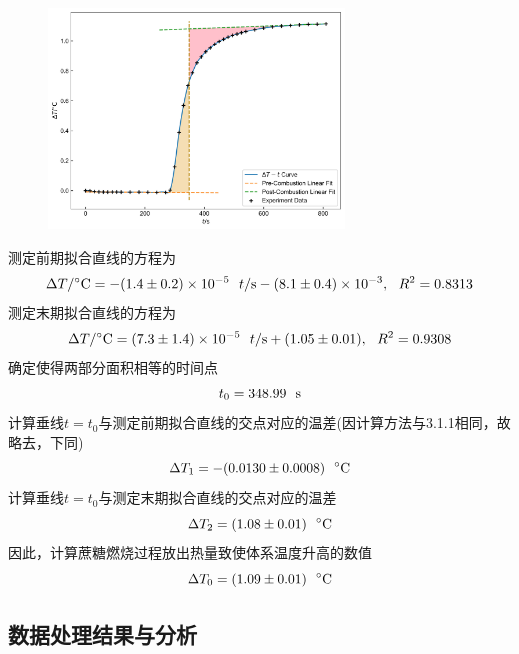\documentclass[12pt]{article}
\begin{document}
\begin{figure}[h]
	\centering
	\includegraphics[width=0.7\textwidth]{2.jpg}
\end{figure}
\par
测定前期拟合直线的方程为
$$
\Delta T/{\rm ^{\circ}C} =-(1.4\pm 0.2)\times 10^{-5} \ \ t/{\rm s}-(8.1\pm 0.4)\times 10^{-3},\  \ R^{2}=0.8313
$$
测定末期拟合直线的方程为
$$
\Delta T/{\rm ^{\circ}C} =(7.3\pm 1.4)\times 10^{-5} \ \ t/{\rm s}+(1.05\pm 0.01),\  \ R^{2}=0.9308
$$
确定使得两部分面积相等的时间点
$$
t_{0}=348.99\ \ {\rm s}
$$
计算垂线$t=t_{0}$与测定前期拟合直线的交点对应的温差(因计算方法与3.1.1相同，故略去，下同)
$$
\Delta T_{1}=-(0.0130\pm 0.0008)\ \ {\rm ^{\circ}C}
$$
计算垂线$t=t_{0}$与测定末期拟合直线的交点对应的温差
$$
\Delta T_{2}=(1.08\pm 0.01)\ \ {\rm ^{\circ}C}
$$
因此，计算蔗糖燃烧过程放出热量致使体系温度升高的数值
$$
\Delta T_{0}=(1.09\pm 0.01)\ \ {\rm ^{\circ}C}
$$


 \subsection{数据处理结果与分析}
\end{document}
